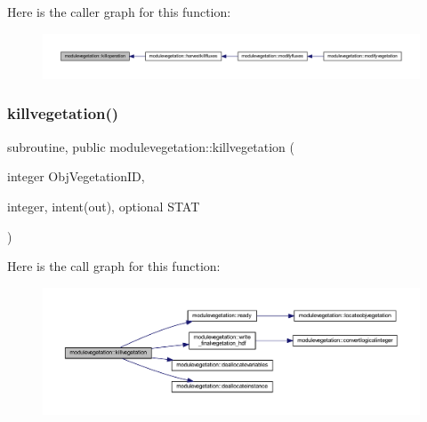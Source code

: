Here is the caller graph for this function\+:\nopagebreak
\begin{figure}[H]
\begin{center}
\leavevmode
\includegraphics[width=350pt]{namespacemodulevegetation_a48e334671d44b0f7bf51ba2801d47db0_icgraph}
\end{center}
\end{figure}
\mbox{\label{namespacemodulevegetation_abd79c5ff82c66aadb0dd041cf80540b8}} 
\subsubsection{\texorpdfstring{killvegetation()}{killvegetation()}}
{\footnotesize\ttfamily subroutine, public modulevegetation\+::killvegetation (\begin{DoxyParamCaption}\item[{integer}]{Obj\+Vegetation\+ID,  }\item[{integer, intent(out), optional}]{S\+T\+AT }\end{DoxyParamCaption})}

Here is the call graph for this function\+:\nopagebreak
\begin{figure}[H]
\begin{center}
\leavevmode
\includegraphics[width=350pt]{namespacemodulevegetation_abd79c5ff82c66aadb0dd041cf80540b8_cgraph}
\end{center}
\end{figure}
\mbox{\label{namespacemodulevegetation_a86662f45554df67ceb2fd66d1ff3afd1}} 
